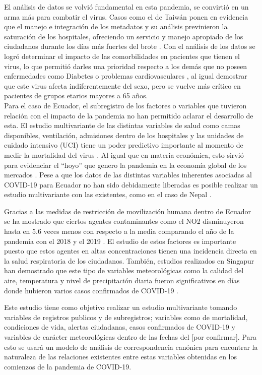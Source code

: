 El análisis de datos se volvió fundamental en esta pandemia, se
convirtió en un arma más para combatir el virus. Casos como el de Taiwán
ponen en evidencia que el manejo e integración de los metadatos y su
análisis previnieron la saturación de los hospitales, ofreciendo un
servicio y manejo apropiado de los ciudadanos durante los días más
fuertes del brote \citep{Chen2020} . Con el análisis de los datos se
logró determinar el impacto de las comorbilidades en pacientes que
tienen el virus, lo que permitió darles una prioridad respecto a los
demás que no poseen enfermedades como Diabetes o problemas
cardiovasculares \citep{Li2020} \citep{Pal2020} \citep{Zhang2020}, al
igual demostrar que este virus afecta indiferentemente del sexo, pero se
vuelve más crítico en pacientes de grupos etarios mayores a 65 años.\\
Para el caso de Ecuador, el subregistro de los factores o variables que
tuvieron relación con el impacto de la pandemia no han permitido aclarar
el desarrollo de esta. El estudio multivariante de las distintas
variables de salud como camas disponibles, ventilación, admisiones
dentro de los hospitales y las unidades de cuidado intensivo (UCI) tiene
un poder predictivo importante al momento de medir la mortalidad del
virus \citep{Fatima2020}. Al igual que en materia económica, esto sirvió
para evidenciar el ``hoyo'' que genero la pandemia en la economía global
de los mercados \citep{Sharma2020}. Pese a que los datos de las
distintas variables inherentes asociadas al COVID-19 para Ecuador no han
sido debidamente liberadas es posible realizar un estudio multivariante
con las existentes, como en el caso de Nepal \citep{Devkota2021}.

Gracias a las medidas de restricción de movilización humana dentro de
Ecuador se ha mostrado que ciertos agentes contaminantes como el NO2
disminuyeron hasta en 5.6 veces menos con respecto a la media comparando
el año de la pandemia con el 2018 y el 2019 \citep{Zambrano2020}. El
estudio de estos factores es importante puesto que estos agentes en
altas concentraciones tienen una incidencia directa en la salud
respiratoria de los ciudadanos. También, estudios realizados en Singapur
han demostrado que este tipo de variables meteorológicas como la calidad
del aire, temperatura y nivel de precipitación diaria fueron
significativos en días donde hubieron varios casos confirmados de
COVID-19 \citep{LORENZO2021111024}.

Este estudio tiene como objetivo realizar un estudio multivariante
tomando variables de registros publicos y de subregistros; variables
como de mortalidad, condiciones de vida, alertas ciudadanas, casos
confirmados de COVID-19 y variables de carácter meteorológicas dentro de
las fechas del {[}por confirmar{]}. Para esto se usará un modelo de
análisis de correspondencia canónica para encontrar la naturaleza de las
relaciones existentes entre estas variables obtenidas en los comienzos
de la pandemia de COVID-19.

